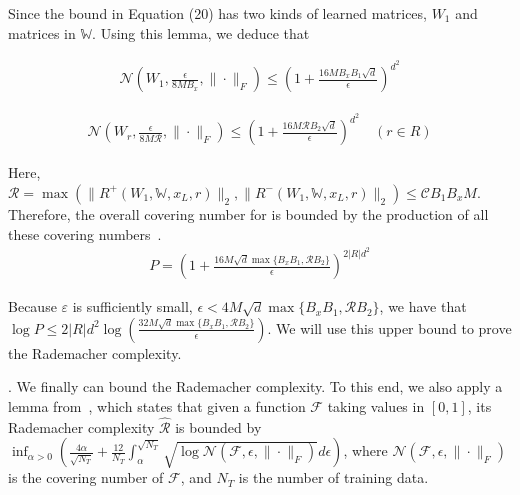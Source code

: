 Since the bound in Equation (20) has two kinds
of learned matrices, \ie $W_1$ and matrices in $\mathds{W}$.
Using this lemma, we deduce that 


\begin{align*}\mathcal{N}\left(W_{1},\frac{\epsilon}{8MB_{x}},\|\cdot\|_{F}\right)
\leq\left(1+\frac{16MB_{x}B_{1}\sqrt{d}}{\epsilon}\right)^{d^{2}}\end{align*}

\begin{align*}\mathcal{N}\left(W_r,\frac{\epsilon}{8M{\mathcal R}},
	\|\cdot\|_{F}\right)\leq\left(1+\frac{16M{\mathcal R}B_{2}\sqrt{d}}{\epsilon}
	\right)^{d^{2}} \quad (r\in R)
\end{align*}

Here, ${\mathcal R} = \max(\|R^+(W_1,\mathds{W},x_L,r)\|_2,
\|R^-(W_1,\mathds{W},x_L,r)\|_2) \leq {\mathcal C} B_1  B_xM$.
Therefore, the overall covering number for \HGIN is bounded
by the production of all these covering numbers~\cite{Gen-bound}.
\begin{align*}P=\left(1+\frac{16M\sqrt d\max\{B_xB_1,{\mathcal R}B_2\}}
{\epsilon}\right)^{2|R|d^2}\end{align*}

Because $\varepsilon$ is sufficiently small, 
\eg $\epsilon<4M\sqrt{d}\max\{B_xB_1,{\mathcal R}B_2\}$,
we have that $\log P\leq 2|R|d^2\log\left(\frac{32M\sqrt{d}\max\{B_xB_1,{\mathcal R}
B_2\}}{\epsilon}\right)$.
We will use this upper bound to prove the Rademacher complexity.


.
We finally can bound the Rademacher complexity.
To this end, we also apply a lemma from~\cite{RB-1},
which states that 
given a function ${\mathcal F}$ taking values
in $[0,1]$, 
its Rademacher complexity 
$\hat{\mathcal{R}}$ 
is bounded by $\inf_{\alpha>0}\left(\frac{4\alpha}{\sqrt{N_T}}+\frac{12}{N_T}\int_{\alpha}^{\sqrt{N_T}}\sqrt{\log\mathcal{N}(\mathcal{F},\epsilon,\|\cdot\|_F)}d\epsilon\right)$,
where $\mathcal{N}(\mathcal{F},\epsilon,\|\cdot\|_F)$ is the covering 
number of $\mathcal{F}$, and
$N_T$ is the number of training data.


